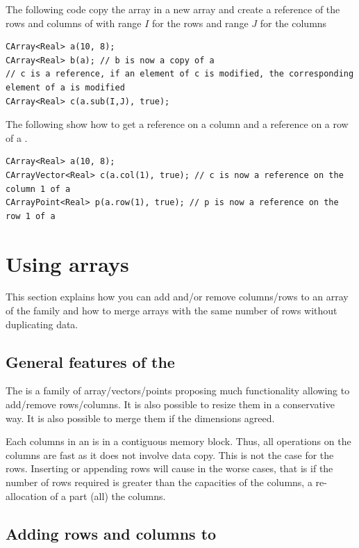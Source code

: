 \documentclass[a4paper,10pt]{article}
\begin{document}
The following code copy the array  in a new array  and create a
reference of the rows and columns of  with range $I$ for the rows and
range $J$ for the columns
\begin{lstlisting}[style=customcpp]
CArray<Real> a(10, 8);
CArray<Real> b(a); // b is now a copy of a
// c is a reference, if an element of c is modified, the corresponding element of a is modified
CArray<Real> c(a.sub(I,J), true);
\end{lstlisting}
The following show how to get a reference on a column and a reference on a row of a .
\begin{lstlisting}[style=customcpp]
CArray<Real> a(10, 8);
CArrayVector<Real> c(a.col(1), true); // c is now a reference on the column 1 of a
CArrayPoint<Real> p(a.row(1), true); // p is now a reference on the row 1 of a
\end{lstlisting}

\section{Using  arrays}

This section explains how you can add and/or remove columns/rows to an array of
the  family and how to merge arrays with the same number of rows
without duplicating data.

\subsection{General features of the }

The  is a family of array/vectors/points proposing much
functionality allowing to add/remove rows/columns. It is also possible to
resize them in a conservative way. It is also possible to merge them if the
dimensions agreed.

Each columns in an  is in a contiguous memory block. Thus, all
operations on the columns are fast as it does not involve data copy. This is not
the case for the rows. Inserting or appending rows will cause in the worse cases,
that is if the number of rows required is greater than the capacities of the columns,
a re-allocation of a part (all) the columns.

\subsection{Adding rows and columns to }
\end{document}
